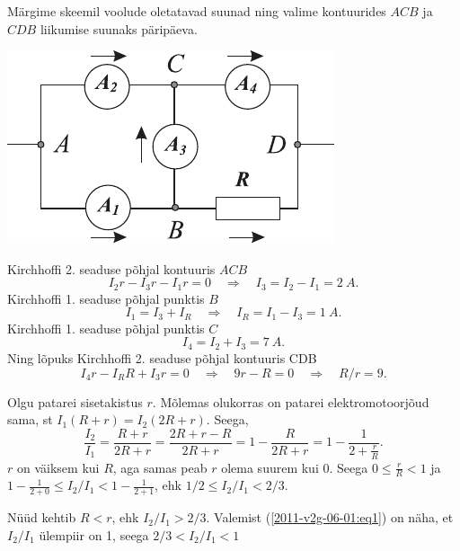 \documentclass[10pt, twoside]{article}
\begin{document}
{%

\solu
Märgime skeemil voolude oletatavad suunad ning valime kontuurides $ACB$ ja $CDB$
liikumise suunaks päripäeva.

\begin{center}
	\includegraphics[width=0.6\linewidth]{2008-lahg-04-lah}
\end{center}

Kirchhoffi 2. seaduse põhjal kontuuris $ACB$
\[
I_2r - I_3r - I_1r = 0 \quad\Rightarrow\quad I_3 = I_2 - I_1 = \SI{2}{A}.
\]
Kirchhoffi 1. seaduse põhjal punktis $B$
\[
I_1 = I_3 + I_R \quad\Rightarrow\quad I_R = I_1 - I_3 = \SI{1}{A}.
\]
Kirchhoffi 1. seaduse põhjal punktis $C$
\[
I_4 = I_2 + I_3 = \SI{7}{A}.
\]
Ning lõpuks Kirchhoffi 2. seaduse põhjal kontuuris CDB
\[
I_4r - I_RR + I_3r = 0 \quad\Rightarrow\quad 9r - R = 0 \quad\Rightarrow\quad R/r = \num{9}.
\]
\probend
\bigskip


\solu
Olgu patarei sisetakistus $r$. Mõlemas olukorras on patarei elektromotoorjõud sama, st $I_1(R + r) = I_2(2R + r)$. Seega,
\begin{equation}\label{2011-v2g-06-01:eq1}
\frac{I_2}{I_1} = \frac{R + r}{2R + r} = \frac{2R + r - R}{2R + r} = 1 - \frac{R}{2R + r} = 1 - \frac{1}{2 + \frac{r}{R}}.
\end{equation}
\osa $r$ on väiksem kui $R$, aga samas peab $r$ olema suurem kui \num{0}. Seega $0 \leq \frac{r}{R} < 1$ ja $1 - \frac{1}{2 + 0} \leq I_2/I_1 < 1 - \frac{1}{2 + 1}$, ehk $1 / 2 \leq I_{2} / I_{1}<2 / 3$.

\osa Nüüd kehtib $R < r$, ehk $I_2/I_1 > 2/3$. Valemist (\ref{2011-v2g-06-01:eq1}) on näha, et $I_2/I_1$ ülempiir on \num{1}, seega $2/3 < I_2/I_1 < 1$
\probend
\bigskip


}
\end{document}
